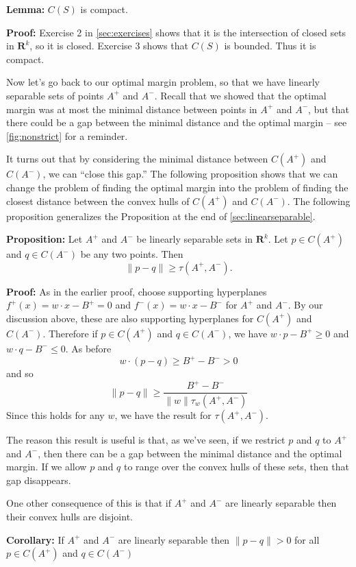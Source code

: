 \documentclass[
]{article}
\begin{document}
\textbf{Lemma:} \(C(S)\) is compact.

\textbf{Proof:} Exercise 2 in \cref{sec:exercises} shows that it is the
intersection of closed sets in \(\mathbf{R}^{k}\), so it is closed.
Exercise 3 shows that \(C(S)\) is bounded. Thus it is compact.

Now let's go back to our optimal margin problem, so that we have
linearly separable sets of points \(A^{+}\) and \(A^{-}\). Recall that
we showed that the optimal margin was at most the minimal distance
between points in \(A^{+}\) and \(A^{-}\), but that there could be a gap
between the minimal distance and the optimal margin -- see
\cref{fig:nonstrict} for a reminder.

It turns out that by considering the minimal distance between
\(C(A^{+})\) and \(C(A^{-})\), we can ``close this gap.'' The following
proposition shows that we can change the problem of finding the optimal
margin into the problem of finding the closest distance between the
convex hulls of \(C(A^{+})\) and \(C(A^{-})\). The following proposition
generalizes the Proposition at the end of \cref{sec:linearseparable}.

\textbf{Proposition:} Let \(A^{+}\) and \(A^{-}\) be linearly separable
sets in \(\mathbf{R}^{k}\). Let \(p\in C(A^{+})\) and \(q\in C(A^{-})\)
be any two points. Then \[
\|p-q\|\ge \tau(A^{+},A^{-}).
\]

\textbf{Proof:} As in the earlier proof, choose supporting hyperplanes
\(f^{+}(x)=w\cdot x-B^{+}=0\) and \(f^{-}(x)=w\cdot x-B^{-}\) for
\(A^{+}\) and \(A^{-}\). By our discussion above, these are also
supporting hyperplanes for \(C(A^{+})\) and \(C(A^{-})\). Therefore if
\(p\in C(A^{+})\) and \(q\in C(A^{-})\), we have \(w\cdot p-B^{+}\ge 0\)
and \(w\cdot q-B^{-}\le 0\). As before \[
w\cdot(p-q)\ge B^{+}-B^{-}>0
\] and so \[
\|p-q\|\ge\frac{B^{+}-B^{-}}{\|w\|\tau_{w}(A^{+},A^{-})}
\] Since this holds for any \(w\), we have the result for
\(\tau(A^{+},A^{-})\).

The reason this result is useful is that, as we've seen, if we restrict
\(p\) and \(q\) to \(A^{+}\) and \(A^{-}\), then there can be a gap
between the minimal distance and the optimal margin. If we allow \(p\)
and \(q\) to range over the convex hulls of these sets, then that gap
disappears.

One other consequence of this is that if \(A^{+}\) and \(A^{-}\) are
linearly separable then their convex hulls are disjoint.

\textbf{Corollary:} If \(A^{+}\) and \(A^{-}\) are linearly separable
then \(\|p-q\|>0\) for all \(p\in C(A^{+})\) and \(q\in C(A^{-})\)
\end{document}
